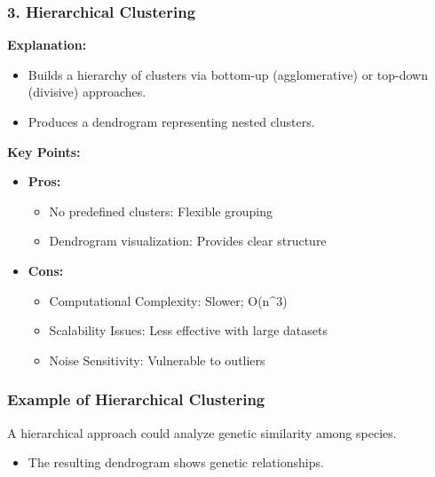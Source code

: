 \documentclass[aspectratio=169]{beamer}
\begin{document}
\begin{frame}[fragile]
    \frametitle{3. Hierarchical Clustering}
    \textbf{Explanation:}
    \begin{itemize}
        \item Builds a hierarchy of clusters via bottom-up (agglomerative) or top-down (divisive) approaches.
        \item Produces a dendrogram representing nested clusters.
    \end{itemize}

    \textbf{Key Points:}
    \begin{itemize}
        \item \textbf{Pros:}
        \begin{itemize}
            \item No predefined clusters: Flexible grouping
            \item Dendrogram visualization: Provides clear structure
        \end{itemize}
        \item \textbf{Cons:}
        \begin{itemize}
            \item Computational Complexity: Slower; O(n^3)
            \item Scalability Issues: Less effective with large datasets
            \item Noise Sensitivity: Vulnerable to outliers
        \end{itemize}
    \end{itemize}
\end{frame}

\begin{frame}[fragile]
    \frametitle{Example of Hierarchical Clustering}
    A hierarchical approach could analyze genetic similarity among species. 
    \begin{itemize}
        \item The resulting dendrogram shows genetic relationships.
    \end{itemize}
\end{frame}
\end{document}
